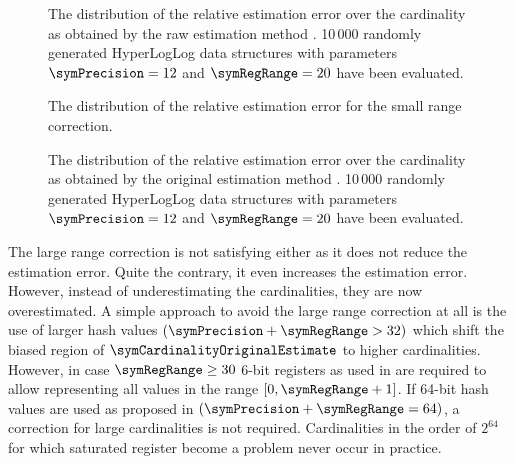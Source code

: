 \documentclass[11pt]{article} %
\begin{document}
\begin{figure}
\centering

\caption{The distribution of the relative estimation error over the cardinality as obtained by the raw estimation method \cite{Flajolet2007}. 10\,000 randomly generated HyperLogLog data structures with parameters $\symPrecision = 12$ and $\symRegRange=20$ have been evaluated.}
\label{fig:raw_estimate}
\end{figure}

\begin{figure}
\centering

\caption{The distribution of the relative estimation error for the small range correction.}
\label{fig:small_range_estimate}
\end{figure}

\begin{figure}
\centering

\caption{The distribution of the relative estimation error over the cardinality as obtained by the original estimation method \cite{Flajolet2007}. 10\,000 randomly generated HyperLogLog data structures with parameters $\symPrecision = 12$ and $\symRegRange=20$ have been evaluated.}
\label{fig:original_estimate}
\end{figure}

The large range correction is not satisfying either as it does not reduce the estimation error. Quite the contrary, it even increases the estimation error. However, instead of underestimating the cardinalities, they are now overestimated. A simple approach to avoid the large range correction at all is the use of larger hash values $(\symPrecision+\symRegRange>32)$ which shift the biased region of $\symCardinalityOriginalEstimate$ to higher cardinalities. However, in case $\symRegRange \geq 30$ 6-bit registers as used in \cite{Heule2013} are required to allow representing all values in the range $[0, \symRegRange+1]$. If 64-bit hash values are used as proposed in \cite{Heule2013} $(\symPrecision+\symRegRange=64)$, a correction for large cardinalities is not required. Cardinalities in the order of $2^{64}$ for which saturated register become a problem never occur in practice.

%
\end{document}
